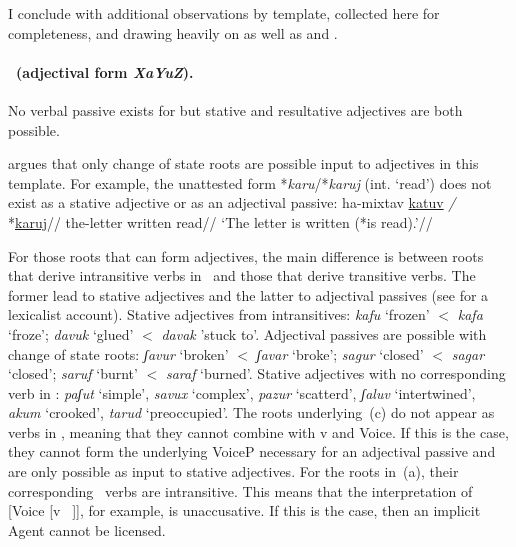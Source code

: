 I conclude with additional observations by template, collected here for completeness, and drawing heavily on \cite{doron00} as well as \cite{doron14adj} and \cite{meltzerasscher11}.



\paragraph*{\tkal~(adjectival form \emph{XaYuZ}).} No verbal passive exists for {\tkal} but stative and resultative adjectives are both possible.

\cite{doron00} argues that only change of state roots are possible input to adjectives in this template. For example, the unattested form *\emph{karu}/*\emph{karuj} (int. `read') does not exist as a stative adjective or as an adjectival passive:
\ex
  \begingl
    \gla ha-mixtav \underline{katuv} \emph{/} *\underline{karuj}//
    \glb the-letter written {} read//
    \glft `The letter is written (*is read).'//
  \endgl
\xe

For those roots that can form adjectives, the main difference is between roots that derive intransitive verbs in \tkal~and those that derive transitive verbs. The former lead to stative adjectives and the latter to adjectival passives (see \citealt{meltzerasscher11} for a lexicalist account).
\pex 
  \a Stative adjectives from intransitives: \emph{kafu} `frozen' $<$ \emph{kafa} `froze'; \emph{davuk} `glued' $<$ \emph{davak} 'stuck to'. %
  \a Adjectival passives are possible with change of state roots: \emph{ʃavur} `broken' $<$ \emph{ʃavar} `broke'; \emph{sagur} `closed' $<$ \emph{sagar} `closed'; \emph{saruf} `burnt' $<$ \emph{saraf} `burned'. %
  \a Stative adjectives with no corresponding verb in \tkal: \emph{paʃut} `simple', \emph{savux} `complex', \emph{pazur} `scatterd', \emph{ʃaluv} `intertwined', \emph{akum} `crooked', \emph{tarud} `preoccupied'.
  \xe
The roots underlying~(\lastx c) do not appear as verbs in \tkal, meaning that they cannot combine with v and Voice. If this is the case, they cannot form the underlying VoiceP necessary for an adjectival passive and are only possible as input to stative adjectives. For the roots in~(\lastx a), their corresponding \tkal~verbs are intransitive. This means that the interpretation of [Voice [v ~\!]], for example, is unaccusative. If this is the case, then an implicit Agent cannot be licensed.


